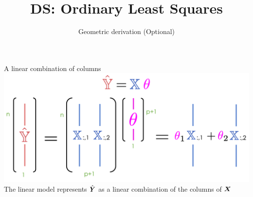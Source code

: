 \documentclass[aspectratio=169]{../latex_main/tntbeamer}  %
\title[Regression]{DS: Ordinary Least Squares}
\subtitle{Geometric derivation (Optional)}
\begin{document}
	
	\maketitle
	\begin{frame}{A linear combination of columns}
	    \includegraphics[scale=.4]{Bild5}\\
	    The linear model represents  ${\hat{\bm{Y}}}$     as a linear combination of the columns of     $\bm{X}$ 
	\end{frame}
	
\end{document}
